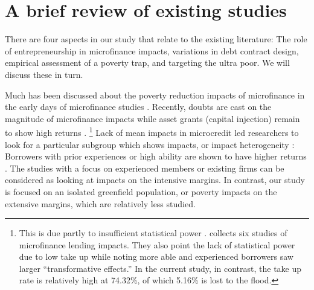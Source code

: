 \section{A brief review of existing studies}
\label{SecExistingStudies}

	There are four aspects in our study that relate to the existing literature: The role of entrepreneurship in microfinance impacts, variations in debt contract design, empirical assessment of a poverty trap, and targeting the ultra poor. We will discuss these in turn.

	Much has been discussed about the poverty reduction impacts of microfinance in the early days of microfinance studies \citep{PittKhandker1998, Morduch1999}. Recently, doubts are cast on the magnitude of microfinance impacts \citep{BanerjeeKarlanZinman2015, DuvendackMader2019, Meager2019} while asset grants (capital injection) remain to show high returns \citep{deMel2008, DeMel2014, FafchampsFlypaper2014, BandieraBRAC2017}. \footnote{This is due partly to insufficient statistical power \citep{MckenzieWoodruff2013}. \citet{BanerjeeKarlanZinman2015} collects six studies of microfinance lending impacts. They also point the lack of statistical power due to low take up while noting more able and experienced borrowers saw larger ``transformative effects.'' %
	In the current study, in contrast, the take up rate is relatively high at 74.32\%, of which 5.16\% is lost to the flood.  } Lack of mean impacts in microcredit led researchers to look for a particular subgroup which shows impacts, or impact heterogeneity \citep{Banerjee2017HyderabadFollowup}: Borrowers with prior experiences or high ability are shown to have higher returns \citep{Banerjee2015Miracle, Mckenzie2017Spurring, Buera2017, Banerjee2019MFPovertyTrap}. The studies with a focus on experienced members or existing firms can be considered as looking at impacts on the intensive margins. In contrast, our study is focused on an isolated greenfield population, or poverty impacts on the extensive margins, which are relatively less studied.

